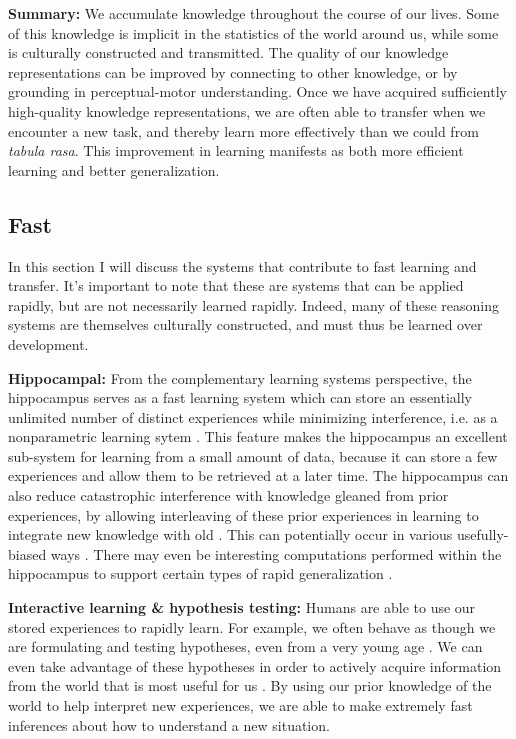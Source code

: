 \textbf{Summary:} We accumulate knowledge throughout the course of our lives. Some of this knowledge is implicit in the statistics of the world around us, while some is culturally constructed and transmitted. The quality of our knowledge representations can be improved by connecting to other knowledge, or by grounding in perceptual-motor understanding. Once we have acquired sufficiently high-quality knowledge representations, we are often able to transfer when we encounter a new task, and thereby learn more effectively than we could from \textit{tabula rasa}. This improvement in learning manifests as both more efficient learning and better generalization. \par

\subsection{Fast}
In this section I will discuss the systems that contribute to fast learning and transfer. It's important to note that these are systems that can be applied rapidly, but are not necessarily learned rapidly. Indeed, many of these reasoning systems are themselves culturally constructed, and must thus be learned over development. \par
\textbf{Hippocampal:} From the complementary learning systems perspective, the hippocampus serves as a fast learning system which can store an essentially unlimited number of distinct experiences while minimizing interference, i.e. as a nonparametric learning sytem \citep{Kumaran2016}. This feature makes the hippocampus an excellent sub-system for learning from a small amount of data, because it can store a few experiences and allow them to be retrieved at a later time. The hippocampus can also reduce catastrophic interference \citep{McCloskey1989} with knowledge gleaned from prior experiences, by allowing interleaving of these prior experiences in learning to integrate new knowledge with old \citep{McClelland1995}. This can potentially occur in various usefully-biased ways \citep{Kumaran2016, McClelland2020}. There may even be interesting computations performed within the hippocampus to support certain types of rapid generalization \citep{Kumaran2012}. \par 
\textbf{Interactive learning \& hypothesis testing:} Humans are able to use our stored experiences to rapidly learn. For example, we often behave as though we are formulating and testing hypotheses, even from a very young age \citep{Sobel2004, Gopnik2014}. We can even take advantage of these hypotheses in order to actively acquire information from the world that is most useful for us \citep[e.g.][]{Markant2014a}. By using our prior knowledge of the world to help interpret new experiences, we are able to make extremely fast inferences about how to understand a new situation. \par
